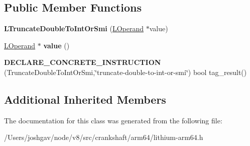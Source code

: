 \subsection*{Public Member Functions}
\begin{DoxyCompactItemize}
\item 
{\bfseries L\+Truncate\+Double\+To\+Int\+Or\+Smi} (\hyperlink{classv8_1_1internal_1_1_l_operand}{L\+Operand} $\ast$value)\hypertarget{classv8_1_1internal_1_1_l_truncate_double_to_int_or_smi_aa1fa9a8f4f155dfda78d805c88d7a1a3}{}\label{classv8_1_1internal_1_1_l_truncate_double_to_int_or_smi_aa1fa9a8f4f155dfda78d805c88d7a1a3}

\item 
\hyperlink{classv8_1_1internal_1_1_l_operand}{L\+Operand} $\ast$ {\bfseries value} ()\hypertarget{classv8_1_1internal_1_1_l_truncate_double_to_int_or_smi_a6b1ba37f4e269aa1672e3855492b87ee}{}\label{classv8_1_1internal_1_1_l_truncate_double_to_int_or_smi_a6b1ba37f4e269aa1672e3855492b87ee}

\item 
{\bfseries D\+E\+C\+L\+A\+R\+E\+\_\+\+C\+O\+N\+C\+R\+E\+T\+E\+\_\+\+I\+N\+S\+T\+R\+U\+C\+T\+I\+ON} (Truncate\+Double\+To\+Int\+Or\+Smi,\char`\"{}truncate-\/double-\/to-\/int-\/or-\/smi\char`\"{}) bool tag\+\_\+result()\hypertarget{classv8_1_1internal_1_1_l_truncate_double_to_int_or_smi_acb9e4cf882d5b0e447b8f9a7e625da53}{}\label{classv8_1_1internal_1_1_l_truncate_double_to_int_or_smi_acb9e4cf882d5b0e447b8f9a7e625da53}

\end{DoxyCompactItemize}
\subsection*{Additional Inherited Members}


The documentation for this class was generated from the following file\+:\begin{DoxyCompactItemize}
\item 
/\+Users/joshgav/node/v8/src/crankshaft/arm64/lithium-\/arm64.\+h\end{DoxyCompactItemize}
